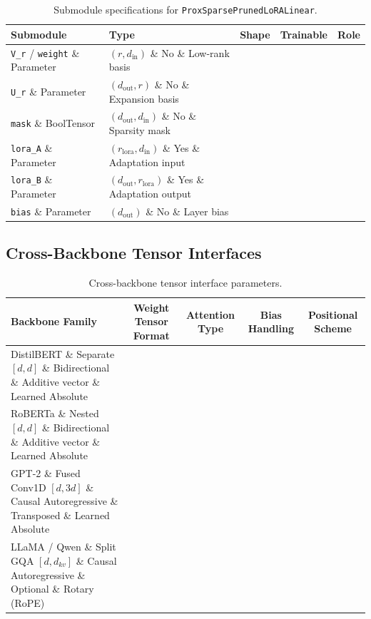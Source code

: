 \begin{table}[H]
\centering
\small
\begin{tabularx}{\linewidth}{llccX}
\toprule
\textbf{Submodule} & \textbf{Type} & \textbf{Shape} & \textbf{Trainable} & \textbf{Role} \\
\midrule
\texttt{V\_r} / \texttt{weight} \& Parameter & $(r, d_{\text{in}})$ \& No \& Low-rank basis \\
\texttt{U\_r} \& Parameter & $(d_{\text{out}}, r)$ \& No \& Expansion basis \\
\texttt{mask} \& BoolTensor & $(d_{\text{out}}, d_{\text{in}})$ \& No \& Sparsity mask \\
\texttt{lora\_A} \& Parameter & $(r_{\text{lora}}, d_{\text{in}})$ \& Yes \& Adaptation input \\
\texttt{lora\_B} \& Parameter & $(d_{\text{out}}, r_{\text{lora}})$ \& Yes \& Adaptation output \\
\texttt{bias} \& Parameter & $(d_{\text{out}})$ \& No \& Layer bias \\
\bottomrule
\end{tabularx}
\caption{Submodule specifications for \texttt{ProxSparsePrunedLoRALinear}.}
\label{tab:submodules_proxsparse\_pruner}
\end{table}

\subsection{Cross-Backbone Tensor Interfaces}
\begin{table}[H]
\centering
\small
\begin{tabularx}{\linewidth}{lcccc}
\toprule
\textbf{Backbone Family} & \textbf{Weight Tensor Format} & \textbf{Attention Type} & \textbf{Bias Handling} & \textbf{Positional Scheme} \\
\midrule
DistilBERT \& Separate $[d, d]$ \& Bidirectional \& Additive vector \& Learned Absolute \\
RoBERTa \& Nested $[d, d]$ \& Bidirectional \& Additive vector \& Learned Absolute \\
GPT-2 \& Fused Conv1D $[d, 3d]$ \& Causal Autoregressive \& Transposed \& Learned Absolute \\
LLaMA / Qwen \& Split GQA $[d, d_{kv}]$ \& Causal Autoregressive \& Optional \& Rotary (RoPE) \\
\bottomrule
\end{tabularx}
\caption{Cross-backbone tensor interface parameters.}
\label{tab:backbone_interfaces}
\end{table}

